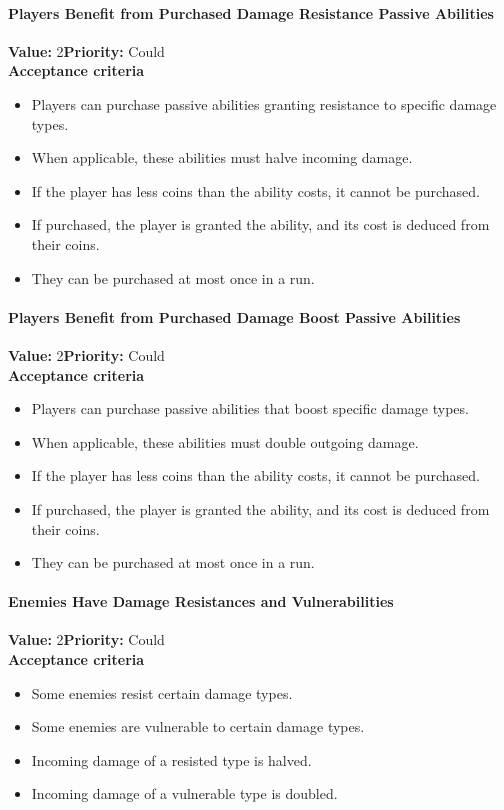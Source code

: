 \paragraph{Players Benefit from Purchased Damage Resistance Passive Abilities}
\textbf{Value:} 2\quad \textbf{Priority:} Could\\
\textbf{Acceptance criteria}
\begin{itemize}
  \item Players can purchase passive abilities granting resistance to specific damage types.
  \item When applicable, these abilities must halve incoming damage.
  \item If the player has less coins than the ability costs, it cannot be purchased.
  \item If purchased, the player is granted the ability, and its cost is deduced from their coins.
  \item They can be purchased at most once in a run.
\end{itemize}

\paragraph{Players Benefit from Purchased Damage Boost Passive Abilities}
\textbf{Value:} 2\quad \textbf{Priority:} Could\\
\textbf{Acceptance criteria}
\begin{itemize}
  \item Players can purchase passive abilities that boost specific damage types.
  \item When applicable, these abilities must double outgoing damage.
  \item If the player has less coins than the ability costs, it cannot be purchased.
  \item If purchased, the player is granted the ability, and its cost is deduced from their coins.
  \item They can be purchased at most once in a run.
\end{itemize}

\paragraph{Enemies Have Damage Resistances and Vulnerabilities}
\textbf{Value:} 2\quad \textbf{Priority:} Could\\
\textbf{Acceptance criteria}
\begin{itemize}
  \item Some enemies resist certain damage types.
  \item Some enemies are vulnerable to certain damage types.
  \item Incoming damage of a resisted type is halved.
  \item Incoming damage of a vulnerable type is doubled.
\end{itemize}

